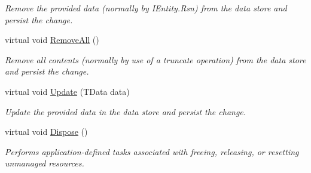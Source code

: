 \begin{DoxyCompactItemize}
\begin{DoxyCompactList}\small\item\em Remove the provided {\itshape data}  (normally by I\+Entity.\+Rsn) from the data store and persist the change. \end{DoxyCompactList}\item 
virtual void \hyperlink{classCqrs_1_1Mongo_1_1DataStores_1_1MongoDataStore_a878966ea796321cae54c3c619e3178d5}{Remove\+All} ()
\begin{DoxyCompactList}\small\item\em Remove all contents (normally by use of a truncate operation) from the data store and persist the change. \end{DoxyCompactList}\item 
virtual void \hyperlink{classCqrs_1_1Mongo_1_1DataStores_1_1MongoDataStore_a03aac0495445d34f124db893cd09cbd8}{Update} (T\+Data data)
\begin{DoxyCompactList}\small\item\em Update the provided {\itshape data}  in the data store and persist the change. \end{DoxyCompactList}\item 
virtual void \hyperlink{classCqrs_1_1Mongo_1_1DataStores_1_1MongoDataStore_a4af729196a5fa4962961c9ce38b74891}{Dispose} ()
\begin{DoxyCompactList}\small\item\em Performs application-\/defined tasks associated with freeing, releasing, or resetting unmanaged resources. \end{DoxyCompactList}\end{DoxyCompactItemize}
